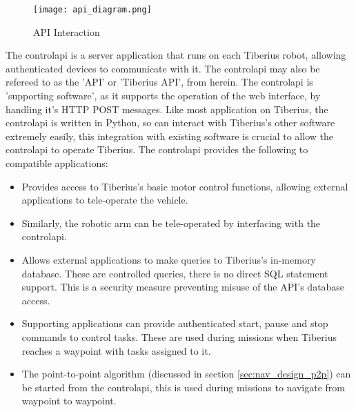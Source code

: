 \begin{figure}[!htb]
\begin{center}
\texttt{[image: api\_diagram.png]}
\end{center}
\caption{API Interaction}
\label{fig:api-interaction}
\end{figure}

The \gls{controlapi} is a server application that runs on each Tiberius robot, allowing authenticated devices to communicate with it. The \gls{controlapi} may also be refereed to as the 'API' or 'Tiberius API', from herein. The \gls{controlapi} is 'supporting software', as it supports the operation of the web interface, by handling it's \gls{HTTP} \gls{POST} messages. Like most application on Tiberius, the \gls{controlapi} is written in Python, so can interact with Tiberius's other software extremely easily, this integration with existing software is crucial to allow the \gls{controlapi} to operate Tiberius. The \gls{controlapi} provides the following to compatible applications:

\begin{itemize}
\item Provides access to Tiberius's basic motor control functions, allowing external applications to tele-operate the vehicle.

\item Similarly, the robotic arm can be tele-operated by interfacing with the \gls{controlapi}.

\item Allows external applications to make queries to Tiberius's in-memory database. These are controlled queries, there is no direct SQL statement support. This is a security measure preventing misuse of the API's database access.

\item Supporting applications can provide authenticated start, pause and stop commands to control tasks. These are used during missions when Tiberius reaches a waypoint with tasks assigned to it.

\item The point-to-point algorithm (discussed in section \ref{sec:nav_design_p2p}) can be started from the \gls{controlapi}, this is used during missions to navigate from waypoint to waypoint.

\end{itemize}

